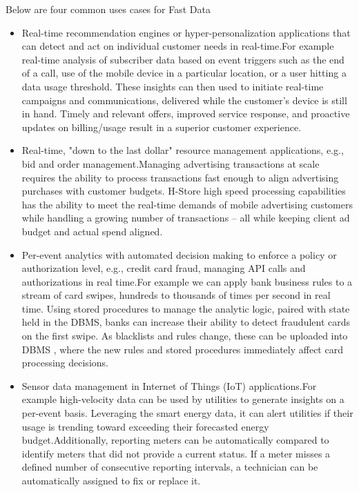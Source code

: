 \documentclass[9pt,twocolumn,twoside]{../../styles/osajnl}
\begin{document}
Below are four common uses cases for Fast Data 
\begin{itemize}
\renewcommand{\labelitemi}{\scriptsize$\bullet$} 
\item Real-time recommendation engines or hyper-personalization applications that can detect and act on individual customer needs in real-time.For example real-time analysis of subscriber data based on event triggers such as the end of a call, use of the mobile device in a particular location, or a user hitting a data usage threshold. These insights can then used to initiate real-time campaigns and communications, delivered while the customer’s device is still in hand. Timely and relevant offers, improved service response, and proactive updates on billing/usage result in a superior customer experience.
\item Real-time, "down to the last dollar" resource management applications, e.g., bid and order management.Managing advertising transactions at scale requires the ability to process transactions fast enough to align advertising purchases with customer budgets. H-Store high speed processing capabilities has the ability to meet the real-time demands of mobile advertising customers while handling a growing number of transactions – all while keeping client ad budget and actual spend aligned.
\item Per-event analytics with automated decision making to enforce a policy or authorization level, e.g., credit card fraud, managing API calls and authorizations in real time.For example we can apply bank business rules to a stream of card swipes, hundreds to thousands of times per second in real time. Using stored procedures to manage the analytic logic, paired with state held in the DBMS, banks can increase their ability to detect fraudulent cards on the first swipe. As blacklists and rules change, these can be uploaded into DBMS , where the new rules and stored procedures immediately affect card processing decisions.
\item Sensor data management in Internet of Things (IoT) applications.For example high-velocity data can be used by utilities to generate insights on a per-event basis. Leveraging the smart energy data, it can alert utilities if their usage is trending toward exceeding their forecasted energy budget.Additionally, reporting meters can be automatically compared to identify meters that did not provide a current status. If a meter misses a defined number of consecutive reporting intervals, a technician can be automatically assigned to fix or replace it.
\end{itemize}
\end{document}
